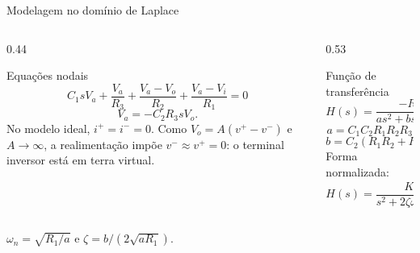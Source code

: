 \begin{frame}{Modelagem no domínio de Laplace}
  \small
  \begin{columns}[T,onlytextwidth]
    \begin{column}{0.44\textwidth}
      \begin{block}{Equações nodais}
        \[
          C_1sV_a+\frac{V_a}{R_3}+\frac{V_a-V_o}{R_2}
          +\frac{V_a-V_i}{R_1}=0
        \]
        \[
          V_a=-C_2R_3sV_o.
        \]
        No modelo ideal, $i^+=i^-=0$.
        Como $V_o=A(v^+-v^-)$ e $A\to\infty$, a realimentação impõe
        $v^-\approx v^+=0$: o terminal inversor está em terra virtual.
      \end{block}
    \end{column}
    \begin{column}{0.53\textwidth}
      \begin{alertblock}{Função de transferência}
        \[
          H(s)=\frac{-R_2}{a s^2+b s+R_1}
        \]
        \[
          a=C_1C_2R_1R_2R_3
        \]
        \[
          b=C_2(R_1R_2+R_1R_3+R_2R_3).
        \]
        Forma normalizada:
        \[
          H(s)=\frac{K\omega_n^2}{s^2+2\zeta\omega_n s+\omega_n^2},
          \qquad K=-\frac{R_2}{R_1}.
        \]
      \end{alertblock}
    \end{column}
  \end{columns}

  \vspace{0.08cm}
  \centering
  \alert{$\omega_n=\sqrt{R_1/a}$ \quad e \quad $\zeta=b/(2\sqrt{aR_1})$.}
\end{frame}
